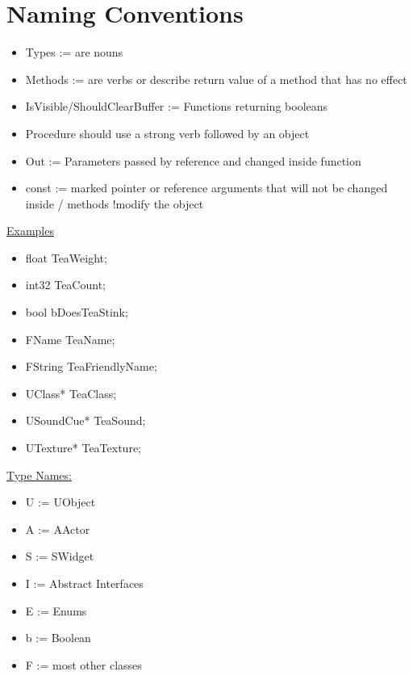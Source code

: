     \section{Naming Conventions}
        \begin{itemize}
            \item Types := are nouns
            \item Methods := are verbs or describe return value of a method that has no effect
            \item IsVisible/ShouldClearBuffer := Functions returning booleans
            \item Procedure should use a strong verb followed by an object
            \item Out := Parameters passed by reference and changed inside function
            \item const := marked pointer or reference arguments that will not be changed inside / methods !modify the object
        \end{itemize}
        \uline{Examples}
        \begin{itemize}
            \item float TeaWeight;
            \item int32 TeaCount;
            \item bool bDoesTeaStink;
            \item FName TeaName;
            \item FString TeaFriendlyName;
            \item UClass* TeaClass;
            \item USoundCue* TeaSound;
            \item UTexture* TeaTexture;
        \end{itemize}
    \smallskip
        \uline{Type Names:}
        \begin{itemize}
            \item U := UObject
            \item A := AActor
            \item S := SWidget
            \item I := Abstract Interfaces
            \item E := Enums
            \item b := Boolean
            \item F := most other classes
        \end{itemize}
        
\bigskip

